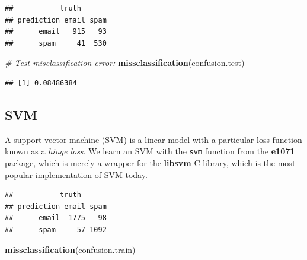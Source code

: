 \documentclass[]{book}
\newenvironment{Shaded}{\begin{snugshade}}{\end{snugshade}}
\newcommand{\KeywordTok}[1]{\textcolor[rgb]{0.13,0.29,0.53}{\textbf{{#1}}}}
\newcommand{\DataTypeTok}[1]{\textcolor[rgb]{0.13,0.29,0.53}{{#1}}}
\newcommand{\FloatTok}[1]{\textcolor[rgb]{0.00,0.00,0.81}{{#1}}}
\newcommand{\StringTok}[1]{\textcolor[rgb]{0.31,0.60,0.02}{{#1}}}
\newcommand{\CommentTok}[1]{\textcolor[rgb]{0.56,0.35,0.01}{\textit{{#1}}}}
\newcommand{\NormalTok}[1]{{#1}}
\theoremstyle{definition}
\theoremstyle{definition}
\theoremstyle{remark}
\begin{document}
\begin{verbatim}
##           truth
## prediction email spam
##      email   915   93
##      spam     41  530
\end{verbatim}

\begin{Shaded}
\begin{Highlighting}[]
\CommentTok{# Test misclassification error:}
\KeywordTok{missclassification}\NormalTok{(confusion.test)}
\end{Highlighting}
\end{Shaded}

\begin{verbatim}
## [1] 0.08486384
\end{verbatim}

\subsection{SVM}\label{svm}

A support vector machine (SVM) is a linear model with a particular loss
function known as a \emph{hinge loss}. We learn an SVM with the
\texttt{svm} function from the \textbf{e1071} package, which is merely a
wrapper for the \textbf{libsvm} C library, which is the most popular
implementation of SVM today.

\begin{Shaded}
\end{Shaded}

\begin{verbatim}
##           truth
## prediction email spam
##      email  1775   98
##      spam     57 1092
\end{verbatim}

\begin{Shaded}
\begin{Highlighting}[]
\KeywordTok{missclassification}\NormalTok{(confusion.train)}
\end{Highlighting}
\end{Shaded}
\end{document}
